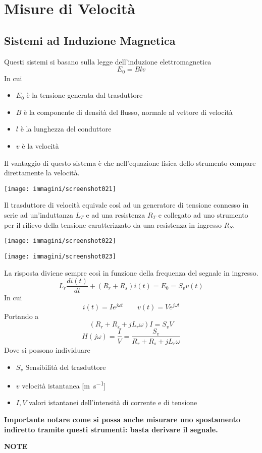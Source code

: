 \documentclass[a4paper, 15pt]{article}
\begin{document}
\section{Misure di Velocità}
\subsection{Sistemi ad Induzione Magnetica}
\begin{adjustwidth}{2in}{}
	Questi sistemi si basano sulla legge dell'induzione elettromagnetica
	\[E_0 = Blv\]
	In cui 
	\begin{itemize}
		\item $E_0$ è la tensione generata dal trasduttore 
		\item $B$ è la componente di densità del flusso, normale al vettore di velocità
		\item $l$ è la lunghezza del conduttore 
		\item $v$ è la velocità
	\end{itemize}
	Il vantaggio di questo sistema è che nell'equazione fisica dello strumento compare direttamente la velocità.
	\begin{center}
		\texttt{[image: immagini/screenshot021]}
	\end{center}
	Il trasduttore di velocità equivale così ad un generatore di tensione connesso in serie ad un'induttanza $L_T$ e ad una resistenza $R_T$ e collegato ad uno strumento per il rilievo della tensione caratterizzato da una resistenza in ingresso $R_S$. 
	\begin{center}
		\texttt{[image: immagini/screenshot022]}
	\end{center}
	\begin{center}
		\texttt{[image: immagini/screenshot023]}
	\end{center}
	La risposta diviene sempre così in funzione della frequenza del segnale in ingresso. 
	\[L_r\dfrac{di(t)}{dt} + (R_r+R_s)i(t) = E_0=S_vv(t)\]
	In cui
	\[i(t) = Ie^{j\omega t}\qquad v(t)=Ve^{j\omega t}\]
	Portando a 
	\[(R_r+R_s+jL_r\omega)I = S_vV\]
	\[H(j\omega) = \dfrac{I}{V} = \dfrac{S_v}{R_r+R_s+jL_r\omega}\]
	Dove si possono individuare
	\begin{itemize}
		\item \(S_v\) Sensibilità del trasduttore 
		
		\item $v$ velocità istantanea [\si{\metre\per\second}]
		
		\item $I, V$ valori istantanei dell'intensità di corrente e di tensione
	\end{itemize}
	\begin{center}
		\textbf{Importante notare come si possa anche misurare uno spostamento indiretto tramite questi strumenti: basta derivare il segnale.}
	\end{center}
	\newpage
	{\LARGE \textbf{NOTE}}

\end{adjustwidth}
\end{document}
